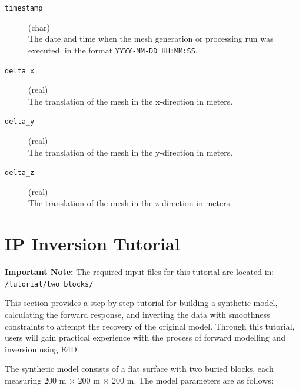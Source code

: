 \documentclass[a4paper,12pt]{article}
\begin{document}
\begin{description}
    \item[\texttt{timestamp}] (char)\hfill \\
          The date and time when the mesh generation or processing run was executed, in the format \texttt{YYYY-MM-DD HH:MM:SS}.

    \item[\texttt{delta\_x}] (real)\hfill \\
          The translation of the mesh in the x-direction in meters.

    \item[\texttt{delta\_y}] (real)\hfill \\
          The translation of the mesh in the y-direction in meters.

    \item[\texttt{delta\_z}] (real)\hfill \\
          The translation of the mesh in the z-direction in meters.
\end{description}

\newpage
\section{IP Inversion Tutorial}

\begin{framed}
    \noindent \textbf{Important Note:} The required input files for this tutorial are located in: \texttt{/tutorial/two\_blocks/}
\end{framed}

This section provides a step-by-step tutorial for building a synthetic model,
calculating the forward response, and inverting the data with smoothness
constraints to attempt the recovery of the original model. Through this
tutorial, users will gain practical experience with the process of forward
modelling and inversion using E4D.

The synthetic model consists of a flat surface with two buried blocks, each
measuring 200 m × 200 m × 200 m. The model parameters are as follows:
\end{document}
